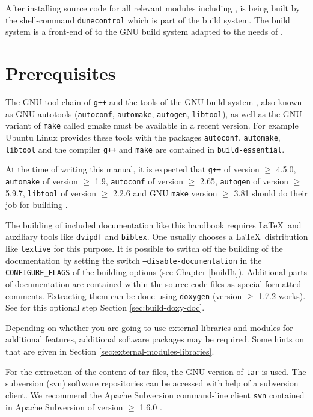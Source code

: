 After installing source code for all relevant \Dune modules including \Dumux, \Dune is being built by the shell-command \texttt{dunecontrol} which is part of the \Dune build system. The \Dune build system is a front-end of to the GNU build system adapted to the needs of \Dune.

\section{Prerequisites} \label{sec:prerequisites}
The GNU tool chain of \texttt{g++}  and the tools of the GNU build system \cite{GNU-BS}, also known as GNU autotools
(\texttt{autoconf}, \texttt{automake}, \texttt{autogen}, \texttt{libtool}), as well as the GNU variant of \texttt{make}
called gmake must be available in a recent version. For example Ubuntu Linux provides these tools with the
packages \texttt{autoconf}, \texttt{automake}, \texttt{libtool}
and the \Cplusplus compiler \texttt{g++} and \texttt{make} are contained in \texttt{build-essential}.

At the time of writing this manual, it is expected that \texttt{g++} of version $\geqslant$ 4.5.0, \texttt{automake} of version $\geqslant$ 1.9,
\texttt{autoconf} of version $\geqslant$ 2.65, \texttt{autogen} of version $\geqslant$ 5.9.7,  \texttt{libtool} of version $\geqslant$ 2.2.6
and GNU \texttt{make} version $\geqslant$ 3.81 should do their job for building \Dumux.

The building of included documentation like this handbook requires \LaTeX\  and auxiliary tools
like \texttt{dvipdf} and \texttt{bibtex}. One usually chooses a \LaTeX\  distribution like \texttt{texlive} for this purpose.
It is possible to switch off the building of the documentation by setting the switch \texttt{--disable-documentation} 
in the \texttt{CONFIGURE\_FLAGS} of the building options (see Chapter \ref{buildIt}).
Additional parts of documentation are contained within the source code files as special formatted comments.
Extracting them can be done using \texttt{doxygen} (version $\geqslant$ 1.7.2 works). 
See for this optional step Section \ref{sec:build-doxy-doc}.

Depending on whether you are going to use external libraries and modules for additional \Dune features, 
additional software packages may be required. Some hints on that are given in Section \ref{sec:external-modules-libraries}.

For the extraction of the content of tar files, the GNU version of \texttt{tar} is used.
The subversion (svn) software repositories can be accessed with help of a subversion client. We recommend the Apache Subversion command-line client \texttt{svn}
contained in Apache Subversion of version $\geqslant$ 1.6.0 \cite{APACHE-SUBVERSION-HP}. 


